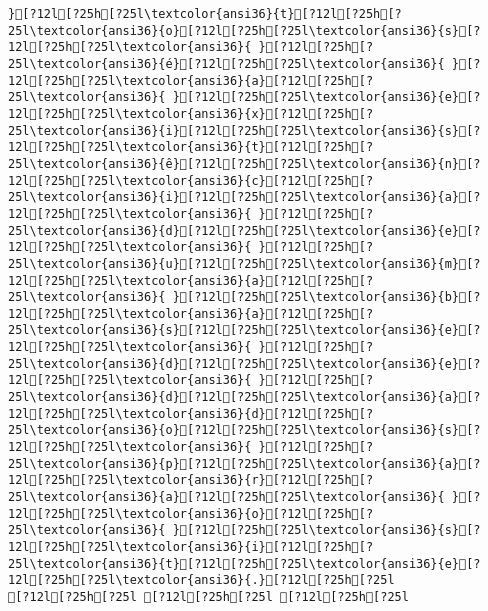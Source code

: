 \documentclass{scrartcl}
\begin{document}
\begin{Verbatim}
}[?12l[?25h[?25l\textcolor{ansi36}{t}[?12l[?25h[?25l\textcolor{ansi36}{o}[?12l[?25h[?25l\textcolor{ansi36}{s}[?12l[?25h[?25l\textcolor{ansi36}{ }[?12l[?25h[?25l\textcolor{ansi36}{é}[?12l[?25h[?25l\textcolor{ansi36}{ }[?12l[?25h[?25l\textcolor{ansi36}{a}[?12l[?25h[?25l\textcolor{ansi36}{ }[?12l[?25h[?25l\textcolor{ansi36}{e}[?12l[?25h[?25l\textcolor{ansi36}{x}[?12l[?25h[?25l\textcolor{ansi36}{i}[?12l[?25h[?25l\textcolor{ansi36}{s}[?12l[?25h[?25l\textcolor{ansi36}{t}[?12l[?25h[?25l\textcolor{ansi36}{ê}[?12l[?25h[?25l\textcolor{ansi36}{n}[?12l[?25h[?25l\textcolor{ansi36}{c}[?12l[?25h[?25l\textcolor{ansi36}{i}[?12l[?25h[?25l\textcolor{ansi36}{a}[?12l[?25h[?25l\textcolor{ansi36}{ }[?12l[?25h[?25l\textcolor{ansi36}{d}[?12l[?25h[?25l\textcolor{ansi36}{e}[?12l[?25h[?25l\textcolor{ansi36}{ }[?12l[?25h[?25l\textcolor{ansi36}{u}[?12l[?25h[?25l\textcolor{ansi36}{m}[?12l[?25h[?25l\textcolor{ansi36}{a}[?12l[?25h[?25l\textcolor{ansi36}{ }[?12l[?25h[?25l\textcolor{ansi36}{b}[?12l[?25h[?25l\textcolor{ansi36}{a}[?12l[?25h[?25l\textcolor{ansi36}{s}[?12l[?25h[?25l\textcolor{ansi36}{e}[?12l[?25h[?25l\textcolor{ansi36}{ }[?12l[?25h[?25l\textcolor{ansi36}{d}[?12l[?25h[?25l\textcolor{ansi36}{e}[?12l[?25h[?25l\textcolor{ansi36}{ }[?12l[?25h[?25l\textcolor{ansi36}{d}[?12l[?25h[?25l\textcolor{ansi36}{a}[?12l[?25h[?25l\textcolor{ansi36}{d}[?12l[?25h[?25l\textcolor{ansi36}{o}[?12l[?25h[?25l\textcolor{ansi36}{s}[?12l[?25h[?25l\textcolor{ansi36}{ }[?12l[?25h[?25l\textcolor{ansi36}{p}[?12l[?25h[?25l\textcolor{ansi36}{a}[?12l[?25h[?25l\textcolor{ansi36}{r}[?12l[?25h[?25l\textcolor{ansi36}{a}[?12l[?25h[?25l\textcolor{ansi36}{ }[?12l[?25h[?25l\textcolor{ansi36}{o}[?12l[?25h[?25l\textcolor{ansi36}{ }[?12l[?25h[?25l\textcolor{ansi36}{s}[?12l[?25h[?25l\textcolor{ansi36}{i}[?12l[?25h[?25l\textcolor{ansi36}{t}[?12l[?25h[?25l\textcolor{ansi36}{e}[?12l[?25h[?25l\textcolor{ansi36}{.}[?12l[?25h[?25l
[?12l[?25h[?25l [?12l[?25h[?25l [?12l[?25h[?25l

\end{Verbatim}
\end{document}
